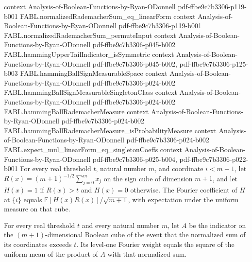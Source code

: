 \begin{theorem}
  {context}
  {Analysis-of-Boolean-Functions-by-Ryan-ODonnell}
  {pdf-ffbe9c7b3306-p119-b001}
\proofstep
  {FABL.normalizedRademacherSum_eq_linearForm}
  {context}
  {Analysis-of-Boolean-Functions-by-Ryan-ODonnell}
  {pdf-ffbe9c7b3306-p119-b001}
\proofstep
  {FABL.normalizedRademacherSum_permuteInput}
  {context}
  {Analysis-of-Boolean-Functions-by-Ryan-ODonnell}
  {pdf-ffbe9c7b3306-p045-b002}
\proofstep
  {FABL.hammingUpperTailIndicator_isSymmetric}
  {context}
  {Analysis-of-Boolean-Functions-by-Ryan-ODonnell}
  {pdf-ffbe9c7b3306-p045-b002,
    pdf-ffbe9c7b3306-p125-b003}
\proofstep
  {FABL.hammingBallSignMeasurableSpace}
  {context}
  {Analysis-of-Boolean-Functions-by-Ryan-ODonnell}
  {pdf-ffbe9c7b3306-p024-b002}
\proofstep
  {FABL.hammingBallSignMeasurableSingletonClass}
  {context}
  {Analysis-of-Boolean-Functions-by-Ryan-ODonnell}
  {pdf-ffbe9c7b3306-p024-b002}
\proofstep
  {FABL.hammingBallRademacherMeasure}
  {context}
  {Analysis-of-Boolean-Functions-by-Ryan-ODonnell}
  {pdf-ffbe9c7b3306-p024-b002}
\proofstep
  {FABL.hammingBallRademacherMeasure_isProbabilityMeasure}
  {context}
  {Analysis-of-Boolean-Functions-by-Ryan-ODonnell}
  {pdf-ffbe9c7b3306-p024-b002}
\proofstep
  {FABL.expect_mul_linearForm_eq_singletonCoeffs}
  {context}
  {Analysis-of-Boolean-Functions-by-Ryan-ODonnell}
  {pdf-ffbe9c7b3306-p025-b004,
    pdf-ffbe9c7b3306-p022-b001}
For every real threshold $t$, natural number $m$, and coordinate $i<m+1$, let
$R(x)=(m+1)^{-1/2}\sum_{j=0}^{m}x_j$ on the sign cube of dimension $m+1$, and let
$H(x)=1$ if $R(x)>t$ and $H(x)=0$ otherwise. The Fourier coefficient of $H$ at $\{i\}$
equals $\mathbb{E}[H(x)R(x)]/\sqrt{m+1}$, with expectation under the uniform measure on
that cube.
\end{theorem}

\begin{theorem}
\label{FABL.fourierWeightAtLevel_one_hammingUpperTailIndicator}
\leanok
{}
For every real threshold $t$ and every natural number $m$, let $A$ be the indicator on
the $(m+1)$-dimensional Boolean cube of the event that the normalized sum of its
coordinates exceeds $t$. Its level-one Fourier weight equals the square of the uniform
mean of the product of $A$ with that normalized sum.
\end{theorem}

